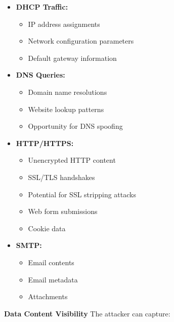 \begin{itemize}
    \item \textbf{DHCP Traffic:}
        \begin{itemize}
            \item IP address assignments
            \item Network configuration parameters
            \item Default gateway information
        \end{itemize}
    
    \item \textbf{DNS Queries:}
        \begin{itemize}
            \item Domain name resolutions
            \item Website lookup patterns
            \item Opportunity for DNS spoofing
        \end{itemize}
        
    \item \textbf{HTTP/HTTPS:}
        \begin{itemize}
            \item Unencrypted HTTP content
            \item SSL/TLS handshakes
            \item Potential for SSL stripping attacks
            \item Web form submissions
            \item Cookie data
        \end{itemize}
        
    \item \textbf{SMTP:}
        \begin{itemize}
            \item Email contents
            \item Email metadata
            \item Attachments
        \end{itemize}
\end{itemize}

\textbf{Data Content Visibility}
The attacker can capture:

